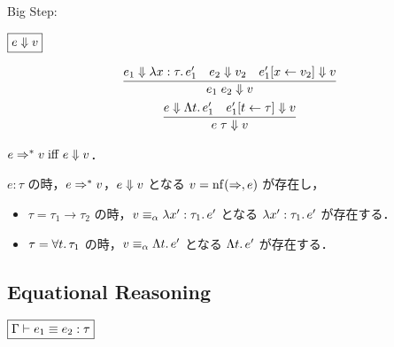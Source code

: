 Big Step:

$\fbox{$e \Downarrow v$}$

\begin{gather*}
  \infer{e_1\; e_2 \bigeval v}{
    e_1 \bigeval \lambda x:\tau\ldotp e'_1
    &
    e_2 \bigeval v_2
    &
    e'_1[x \assign v_2] \bigeval v
  }
  \\
  \infer{e\; \tau \bigeval v}{
    e \bigeval \Lambda t\ldotp e'_1
    &
    e'_1[t \assign \tau] \bigeval v
  }
\end{gather*}

\begin{theorem}
  $e \Rightarrow^* v \mathrel{\mathrm{iff}} e \Downarrow v$．
\end{theorem}

\begin{theorem}
  $e: \tau$ の時，$e \Rightarrow^* v$，$e \Downarrow v$ となる $v = \mathop{\mathrm{nf}}(\Rightarrow, e)$ が存在し，
  \begin{itemize}
    \item $\tau = \tau_1 \to \tau_2$ の時，$v \equiv_\alpha \lambda x':\tau_1\ldotp e'$ となる $\lambda x':\tau_1\ldotp e'$ が存在する．
    \item $\tau = \forall t\ldotp \tau_1$ の時，$v \equiv_\alpha \Lambda t\ldotp e'$ となる $\Lambda t\ldotp e'$ が存在する．
  \end{itemize}
\end{theorem}

\subsection{Equational Reasoning}

$\fbox{$\Gamma \vdash e_1 \equiv e_2: \tau$}$

